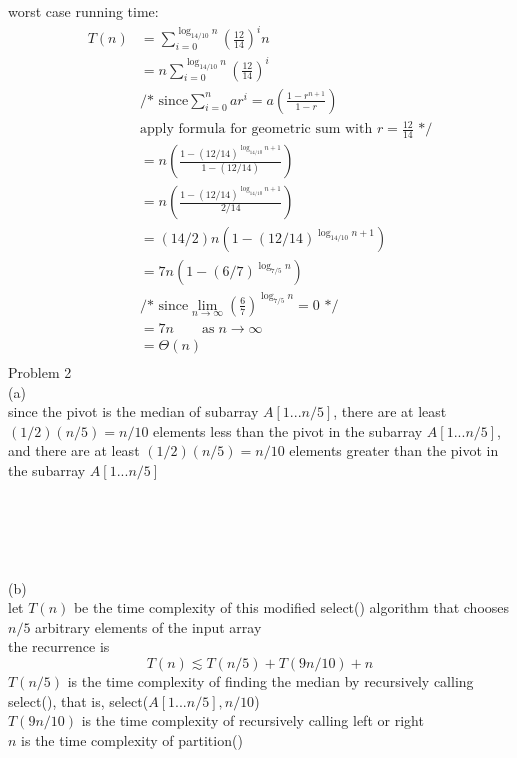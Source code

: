 \documentclass[12pt,border=4pt,multi]{article}%
\begin{document}
worst case running time:
\begin{align*}
T(n) &= \sum_{i = 0}^{\log_{14/10} n} \left(\frac{12}{14}\right)^i n\\
&= n\sum_{i = 0}^{\log_{14/10} n} \left(\frac{12}{14}\right)^i\\
&\text{/* since} \sum_{i = 0}^n ar^i = a\left(\frac{1 - r^{n + 1}}{1 - r}\right)\\
&\text{apply formula for geometric sum with $r = \frac{12}{14}$ */}\\
&= n\left(\frac{1 - (12/14)^{\log_{14/10} n + 1}}{1 - (12/14)}\right)\\
&= n\left(\frac{1 - (12/14)^{\log_{14/10} n + 1}}{2/14}\right)\\
&= (14/2)n\left(1 - (12/14)^{\log_{14/10} n + 1}\right)\\
&= 7n\left(1 - (6/7)^{\log_{7/5} n}\right)\\
&\text{/* since} \lim_{n \rightarrow \infty} \left(\frac{6}{7}\right)^{\log_{7/5} n} = 0\text{ */}\\
&= 7n \qquad \text{as} \; n \rightarrow \infty\\
&= \boxed{\Theta(n)}\\
\end{align*}
\newpage
\noindent
Problem 2\\
(a)\\
since the pivot is the median of subarray $A[1...n/5]$, there are at least $(1/2)(n/5) = n/10$ elements less than the pivot in the subarray $A[1...n/5]$, and there are at least $(1/2)(n/5) = n/10$ elements greater than the pivot in the subarray $A[1...n/5]$\\
\\
\\
\\
\\
\\
(b)\\
let $T(n)$ be the time complexity of this modified select() algorithm that chooses $n/5$ arbitrary elements of the input array\\
the recurrence is
\[T(n) \lesssim T(n/5) + T(9n/10) + n\]
$T(n/5)$ is the time complexity of finding the median by recursively calling select(), that is, select($A[1 . . . n/5], n/10$)\\
$T(9n/10)$ is the time complexity of recursively calling left or right\\
$n$ is the time complexity of partition()\\
\end{document}
